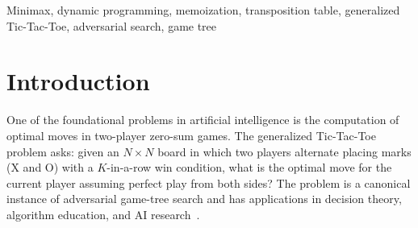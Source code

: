 \documentclass[conference]{IEEEtran}
\begin{document}
\begin{abstract}
The generalized Tic-Tac-Toe problem requires computing the optimal move
on an $N \times N$ board with a $K$-in-a-row win condition, modeled as
a two-player zero-sum adversarial game. This study compares two
algorithmic strategies: a pure brute-force Minimax recursion and a
memoized Minimax using dynamic programming (DP). Both approaches are
implemented in C++, their structures are described, their computational
complexities are analyzed, and their performance is evaluated empirically
across board sizes $N \in \{3, 4, 5\}$ and search depths
$d \in \{2, 4, 6, 8\}$. The benchmark plays a full game per configuration
and sums metrics across all moves. The brute-force solver, which explores
all possible game states without memory, is skipped at $4\times4, d=8$
and $5\times5$ with $d\ge 6$ under our timeout rules, while the DP
memoized solver completes all configurations up to $5\times5, d=6$ and
is skipped only at $5\times5, d=8$. The DP solver achieves cache hit
rates up to 73.6\%. We analyze each method's implementation, complexity,
and the cache hit rate as the key metric explaining their divergent
scalability.
\end{abstract}

\begin{IEEEkeywords}
Minimax, dynamic programming, memoization, transposition table,
generalized Tic-Tac-Toe, adversarial search, game tree
\end{IEEEkeywords}

\section{Introduction}

One of the foundational problems in artificial intelligence is the
computation of optimal moves in two-player zero-sum games. The
generalized Tic-Tac-Toe problem asks: given an $N \times N$ board in
which two players alternate placing marks (X and O) with a
$K$-in-a-row win condition, what is the optimal move for the current
player assuming perfect play from both sides? The problem is a canonical
instance of adversarial game-tree search and has applications in
decision theory, algorithm education, and AI research~\cite{b1, b2}.
\end{document}
